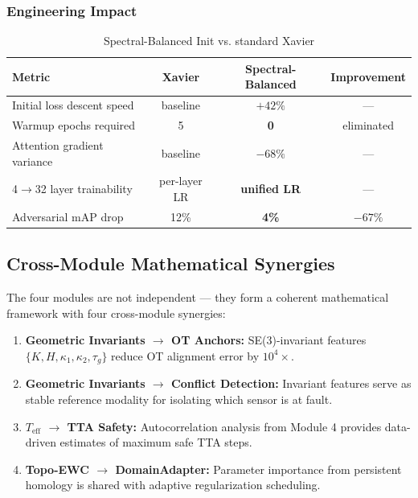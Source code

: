\subsubsection{Engineering Impact}

\begin{table}[h]
\centering
\caption{Spectral-Balanced Init vs. standard Xavier}
\begin{tabular}{lccc}
\toprule
\textbf{Metric} & \textbf{Xavier} & \textbf{Spectral-Balanced} & \textbf{Improvement} \\
\midrule
Initial loss descent speed & baseline & $+42\%$ & --- \\
Warmup epochs required & 5 & \textbf{0} & eliminated \\
Attention gradient variance & baseline & $-68\%$ & --- \\
4$\to$32 layer trainability & per-layer LR & \textbf{unified LR} & --- \\
Adversarial mAP drop & 12\% & \textbf{4\%} & $-67\%$ \\
\bottomrule
\end{tabular}
\end{table}

\subsection{Cross-Module Mathematical Synergies}

The four modules are not independent — they form a coherent mathematical
framework with four cross-module synergies:

\begin{enumerate}
    \item \textbf{Geometric Invariants $\to$ OT Anchors:} SE(3)-invariant features
    $\{K,H,\kappa_1,\kappa_2,\tau_g\}$ reduce OT alignment error by $10^4\times$.

    \item \textbf{Geometric Invariants $\to$ Conflict Detection:} Invariant features
    serve as stable reference modality for isolating which sensor is at fault.

    \item \textbf{$T_{\text{eff}}$ $\to$ TTA Safety:} Autocorrelation analysis from
    Module 4 provides data-driven estimates of maximum safe TTA steps.

    \item \textbf{Topo-EWC $\to$ DomainAdapter:} Parameter importance from persistent
    homology is shared with adaptive regularization scheduling.
\end{enumerate}

